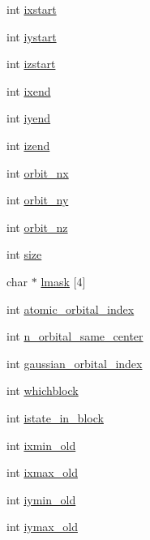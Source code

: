 \begin{DoxyCompactItemize}
\item 
int \hyperlink{struct_s_t_a_t_e_aae8de9b0f0969dc0ce0cbf2838835247}{ixstart}
\item 
int \hyperlink{struct_s_t_a_t_e_a13f2b1d8a6337edad6d78904367852d6}{iystart}
\item 
int \hyperlink{struct_s_t_a_t_e_afbee51a629af4923533c7fe17fb51488}{izstart}
\item 
int \hyperlink{struct_s_t_a_t_e_ad8a76e80bd55f514ee16188399d71831}{ixend}
\item 
int \hyperlink{struct_s_t_a_t_e_aa895902f9eb2ecd8529993a35d2ca999}{iyend}
\item 
int \hyperlink{struct_s_t_a_t_e_aa8b2ea2bc1c925319679eec390be1b81}{izend}
\item 
int \hyperlink{struct_s_t_a_t_e_aa94927b5a219d420966a5990475eaf1f}{orbit\-\_\-nx}
\item 
int \hyperlink{struct_s_t_a_t_e_abccc3277278c0487d6f883c927253a7e}{orbit\-\_\-ny}
\item 
int \hyperlink{struct_s_t_a_t_e_a3cffb85b144ec7959171b756a61f8071}{orbit\-\_\-nz}
\item 
int \hyperlink{struct_s_t_a_t_e_ac9df7874309bf9d2cad2b84ec0514905}{size}
\item 
char $\ast$ \hyperlink{struct_s_t_a_t_e_a64bc98507c0a1e0b485c1b5e29bf4595}{lmask} \mbox{[}4\mbox{]}
\item 
int \hyperlink{struct_s_t_a_t_e_aa8acfa4d06c6669d0ad72c43cf066d4a}{atomic\-\_\-orbital\-\_\-index}
\item 
int \hyperlink{struct_s_t_a_t_e_a58de639bd7969415efdf6c8ef99a1e9a}{n\-\_\-orbital\-\_\-same\-\_\-center}
\item 
int \hyperlink{struct_s_t_a_t_e_a2c3754d1fc95ed0d9a369c878dd19584}{gaussian\-\_\-orbital\-\_\-index}
\item 
int \hyperlink{struct_s_t_a_t_e_ad25111865f203d3ec06c35c6963bbfd9}{whichblock}
\item 
int \hyperlink{struct_s_t_a_t_e_a725463fff112036b9cb6a0613a7ceb16}{istate\-\_\-in\-\_\-block}
\item 
int \hyperlink{struct_s_t_a_t_e_a8d68ec2a9ef81c455ed86d3ed5a6ac54}{ixmin\-\_\-old}
\item 
int \hyperlink{struct_s_t_a_t_e_a3018518cb6fba9483c3be92d6f5beff4}{ixmax\-\_\-old}
\item 
int \hyperlink{struct_s_t_a_t_e_ab70cdc3505e90f1adbc73ab7b3c539a6}{iymin\-\_\-old}
\item 
int \hyperlink{struct_s_t_a_t_e_a307650a357c76cc13f308a02c8235e26}{iymax\-\_\-old}

\end{DoxyCompactItemize}
